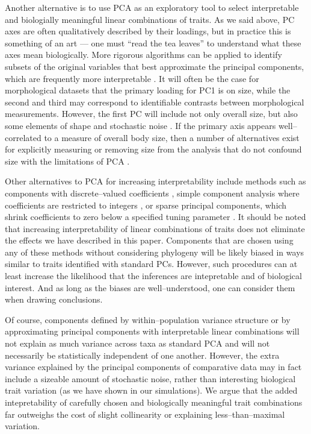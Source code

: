 \documentclass[a4paper,12pt]{article}
\begin{document}
Another alternative is to use PCA as an exploratory tool to select interpretable and biologially meaningful linear combinations of traits. As we said above, PC axes are often qualitatively described by their loadings, but in practice this is something of an art --- one must ``read the tea leaves'' to understand what these axes mean biologically. More rigorous algorithms can be applied to identify subsets of the original variables that best approximate the principal components, which are frequently more interpretable \citep{Cadima2001}. It will often be the case for morphological datasets that the primary loading for PC1 is on size, while the second and third may correspond to identifiable contrasts between morphological measurements. However, the first PC will include not only overall size, but also some elements of shape and stochastic noise \citep{Somers1986, Somers1989}. If the primary axis appears well--correlated to a measure of overall body size, then a number of alternatives exist for explicitly measuring or removing size from the analysis that do not confound size with the limitations of PCA \citep{Somers1989}. 

Other alternatives to PCA for increasing interpretability include methods such as components with discrete--valued coefficients \citep{Hausman1982}, simple component analysis where coefficients are restricted to integers \citep{Vines2000}, or sparse principal components, which shrink coefficients to zero below a specified tuning parameter \citep{Jolliffe2002, Zou2006}. It should be noted that increasing interpretability of linear combinations of traits does not eliminate the effects we have described in this paper. Components that are chosen using any of these methods without considering phylogeny will be likely biased in ways similar to traits identified with standard PCs. However, such procedures can at least increase the likelihood that the inferences are intepretable and of biological interest. And as long as the biases are well--understood, one can consider them when drawing conclusions.  

Of course, components defined by within--population variance structure or by approximating principal components with interpretable linear combinations will not explain as much variance across taxa as standard PCA and will not necessarily be statistically independent of one another. However, the extra variance explained by the principal components of comparative data may in fact include a sizeable amount of stochastic noise, rather than interesting biological trait variation (as we have shown in our simulations). We argue that the added intepretability of carefully chosen and biologically meaningful trait combinations far outweighs the cost of slight collinearity or explaining less--than--maximal variation.
\end{document}
